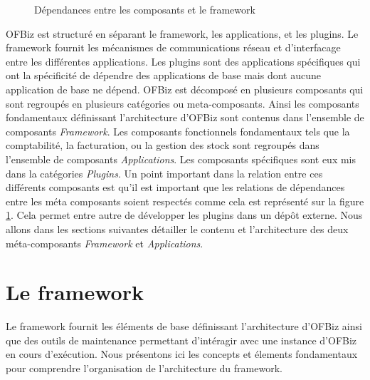 \documentclass[a4paper, 11pt]{report}
\begin{document}
\begin{figure}
  \caption{Dépendances entre les composants et le framework}
  \label{fig:compdep}
\end{figure}

OFBiz est structuré en séparant le framework, les applications, et les
plugins. Le framework fournit les mécanismes de communications réseau
et d'interfacage entre les différentes applications. Les plugins sont
des applications spécifiques qui ont la spécificité de dépendre des
applications de base mais dont aucune application de base ne dépend.
OFBiz est décomposé en plusieurs composants qui sont regroupés en
plusieurs catégories ou meta-composants. Ainsi les composants
fondamentaux définissant l'architecture d'OFBiz sont contenus dans
l'ensemble de composants \emph{Framework}.  Les composants
fonctionnels fondamentaux tels que la comptabilité, la facturation, ou
la gestion des stock sont regroupés dans l'ensemble de composants
\emph{Applications}.  Les composants spécifiques sont eux mis dans la
catégories \emph{Plugins}. Un point important dans la relation entre
ces différents composants est qu'il est important que les relations de
dépendances entre les méta composants soient respectés comme cela est
représenté sur la figure \ref{fig:compdep}.  Cela permet entre autre
de développer les plugins dans un dépôt externe.  Nous allons dans les
sections suivantes détailler le contenu et l'architecture des deux
méta-composants \emph{Framework} et \emph{Applications}.

\section{Le framework}

Le framework fournit les éléments de base définissant l'architecture
d'OFBiz ainsi que des outils de maintenance permettant d'intéragir
avec une instance d'OFBiz en cours d'exécution. Nous présentons ici
les concepts et élements fondamentaux pour comprendre l'organisation
de l'architecture du framework.
\end{document}
